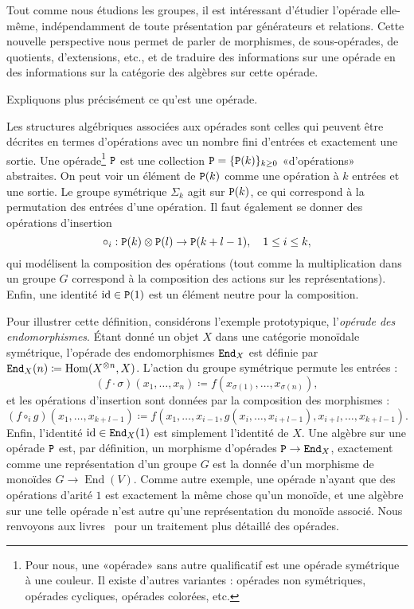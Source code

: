 Tout comme nous étudions les groupes, il est intéressant d'étudier l'opérade elle-même, indépendamment de toute présentation par générateurs et relations.
Cette nouvelle perspective nous permet de parler de morphismes, de sous-opérades, de quotients, d'extensions, etc., et de traduire des informations sur une opérade en des informations sur la catégorie des algèbres sur cette opérade.

Expliquons plus précisément ce qu'est une opérade.



Les structures algébriques associées aux opérades sont celles qui peuvent être décrites en termes d'opérations avec un nombre fini d'entrées et exactement une sortie.
Une opérade\footnote{Pour nous, une «opérade» sans autre qualificatif est une opérade symétrique à une couleur. Il existe d'autres variantes : opérades non symétriques, opérades cycliques, opérades colorées, etc.} $\mathtt{P}$ est une collection $\mathtt{P} = \{ \mathtt{P}(k) \}_{k \geq 0}$ «d'opérations» abstraites.
On peut voir un élément de $\mathtt{P}(k)$ comme une opération à $k$ entrées et une sortie.
Le groupe symétrique $\Sigma_{k}$ agit sur $\mathtt{P}(k)$, ce qui correspond à la permutation des entrées d'une opération.
Il faut également se donner des opérations d'insertion
\[ \circ_{i} : \mathtt{P}(k) \otimes \mathtt{P}(l) \to \mathtt{P}(k+l-1), \quad 1 \leq i \leq k, \]
qui modélisent la composition des opérations (tout comme la multiplication dans un groupe $G$ correspond à la composition des actions sur les représentations).
Enfin, une identité $\operatorname{id} \in \mathtt{P}(1)$ est un élément neutre pour la composition.

Pour illustrer cette définition, considérons l'exemple prototypique, l'\emph{opérade des endomorphismes}.
Étant donné un objet $X$ dans une catégorie monoïdale symétrique, l'opérade des endomorphismes $\mathtt{End}_{X}$ est définie par $\mathtt{End}_{X}(n) \coloneqq \operatorname{Hom}(X^{\otimes n}, X)$.
L'action du groupe symétrique permute les entrées :
\[ (f \cdot \sigma)(x_{1}, \dots, x_{n}) \coloneqq f(x_{\sigma(1)}, \dots, x_{\sigma(n)}), \]
et les opérations d'insertion sont données par la composition des morphismes :
\[ (f \circ_{i} g)(x_{1}, \dots, x_{k+l-1}) \coloneqq f(x_{1}, \dots, x_{i-1}, g(x_{i}, \dots, x_{i+l-1}), x_{i+l}, \dots, x_{k+l-1}). \]
Enfin, l'identité $\operatorname{id} \in \mathtt{End}_{X}(1)$ est simplement l'identité de $X$.
Une algèbre sur une opérade $\mathtt{P}$ est, par définition, un morphisme d'opérades $\mathtt{P} \to \mathtt{End}_{X}$, exactement comme une représentation d'un groupe $G$ est la donnée d'un morphisme de monoïdes $G \to \operatorname{End}(V)$.
Comme autre exemple, une opérade n'ayant que des opérations d'arité $1$ est exactement la même chose qu'un monoïde, et une algèbre sur une telle opérade n'est autre qu'une représentation du monoïde associé.
Nous renvoyons aux livres~\cite{LodayVallette2012,Fresse2017} pour un traitement plus détaillé des opérades.

